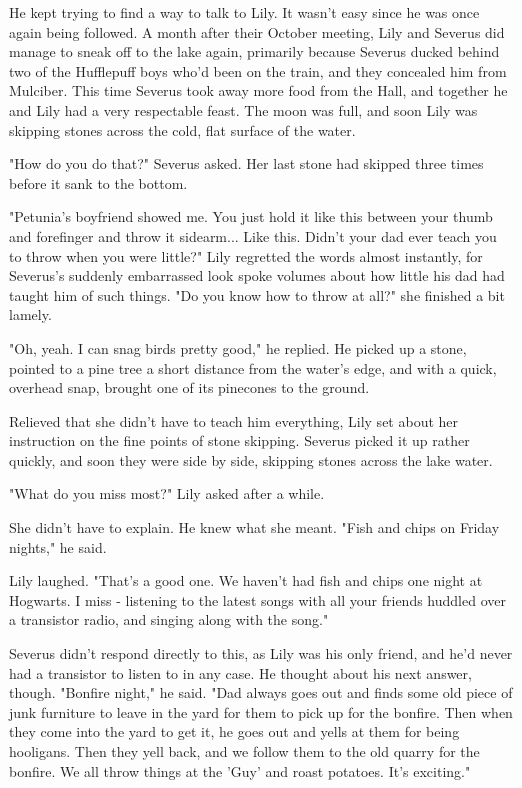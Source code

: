 \documentclass[a4paper,11pt]{article}
\begin{document}
He kept trying to find a way to talk to Lily. It wasn't easy since he was once again being followed. A month after their October meeting, Lily and Severus did manage to sneak off to the lake again, primarily because Severus ducked behind two of the Hufflepuff boys who'd been on the train, and they concealed him from Mulciber. This time Severus took away more food from the Hall, and together he and Lily had a very respectable feast. The moon was full, and soon Lily was skipping stones across the cold, flat surface of the water.

"How do you do that?" Severus asked. Her last stone had skipped three times before it sank to the bottom.

"Petunia's boyfriend showed me. You just hold it like this between your thumb and forefinger and throw it sidearm... Like this. Didn't your dad ever teach you to throw when you were little?" Lily regretted the words almost instantly, for Severus's suddenly embarrassed look spoke volumes about how little his dad had taught him of such things. "Do you know how to throw at all?" she finished a bit lamely.

"Oh, yeah. I can snag birds pretty good," he replied. He picked up a stone, pointed to a pine tree a short distance from the water's edge, and with a quick, overhead snap, brought one of its pinecones to the ground.

Relieved that she didn't have to teach him everything, Lily set about her instruction on the fine points of stone skipping. Severus picked it up rather quickly, and soon they were side by side, skipping stones across the lake water.

"What do you miss most?" Lily asked after a while.

She didn't have to explain. He knew what she meant. "Fish and chips on Friday nights," he said.

Lily laughed. "That's a good one. We haven't had fish and chips one night at Hogwarts. I miss - listening to the latest songs with all your friends huddled over a transistor radio, and singing along with the song."

Severus didn't respond directly to this, as Lily was his only friend, and he'd never had a transistor to listen to in any case. He thought about his next answer, though. "Bonfire night," he said. "Dad always goes out and finds some old piece of junk furniture to leave in the yard for them to pick up for the bonfire. Then when they come into the yard to get it, he goes out and yells at them for being hooligans. Then they yell back, and we follow them to the old quarry for the bonfire. We all throw things at the 'Guy' and roast potatoes. It's exciting."
\end{document}
